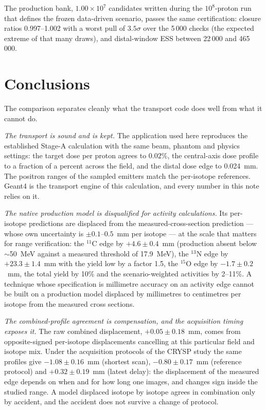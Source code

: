 \documentclass[11pt]{article}
\begin{document}
The production bank, $1.00\times10^{7}$ candidates written during the
$10^{8}$-proton run that defines the frozen data-driven scenario, passes the
same certification: closure ratios 0.997--1.002 with a worst pull of
$3.5\sigma$ over the 5\,000 checks (the expected extreme of that many
draws), and distal-window ESS between 22\,000 and 465\,000.

\section{Conclusions}

The comparison separates cleanly what the transport code does well from
what it cannot do.

\emph{The transport is sound and is kept.}  The application used here
reproduces the established Stage-A calculation with the same beam, phantom
and physics settings: the target dose per proton agrees to $0.02\%$, the
central-axis dose profile to a fraction of a percent across the field, and
the distal dose edge to \SI{0.024}{mm}.  The positron ranges of the sampled
emitters match the per-isotope references.  Geant4 is the transport engine
of this calculation, and every number in this note relies on it.

\emph{The native production model is disqualified for activity
calculations.}  Its per-isotope predictions are displaced from the
measured-cross-section prediction --- whose own uncertainty is
$\pm0.1$--$0.5$~mm per isotope --- at the scale that matters for range
verification: the $^{11}$C edge by $+4.6\pm0.4$~mm (production absent below
$\sim$\SI{50}{MeV} against a measured threshold of \SI{17.9}{MeV}), the
$^{13}$N edge by $+23.3\pm1.4$~mm with the yield low by a factor 1.5, the
$^{15}$O edge by $-1.7\pm0.2$~mm, the total yield by 10\% and the
scenario-weighted activities by 2--11\%.  A technique whose specification
is millimetre accuracy on an activity edge cannot be built on a production
model displaced by millimetres to centimetres per isotope from the measured
cross sections.

\emph{The combined-profile agreement is compensation, and the acquisition
timing exposes it.}  The raw combined displacement, $+0.05\pm0.18$~mm,
comes from opposite-signed per-isotope displacements cancelling at this
particular field and isotope mix.  Under the acquisition protocols of the
CRYSP study the same profiles give $-1.08\pm0.16$~mm (shortest scan),
$-0.80\pm0.17$~mm (reference protocol) and $+0.32\pm0.19$~mm (latest
delay): the displacement of the measured edge depends on when and for how
long one images, and changes sign inside the studied range.  A model
displaced isotope by isotope agrees in combination only by accident, and
the accident does not survive a change of protocol.
\end{document}
